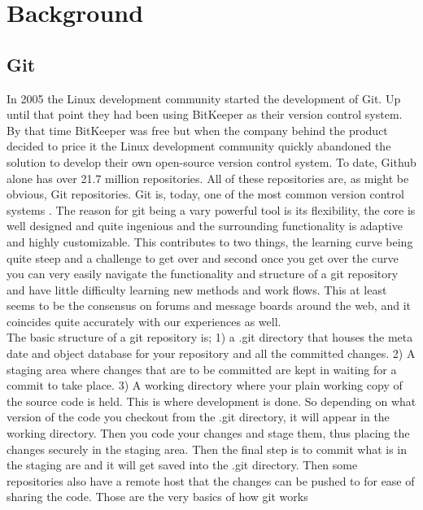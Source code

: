 \documentclass[a4paper,oneside]{bth} %
\begin{document}
		\chapter{Background}
			\section{Git}
			In 2005 the Linux development community started the development of Git.
			Up until that point they had been using BitKeeper as their version control system. By that time BitKeeper was free but when the company behind the product decided to price it the Linux development community quickly abandoned the solution to develop their own open-source version control system.\cite{ProGit}
			To date, Github alone has over 21.7 million repositories.\cite{GithubAbout} All of these repositories are, as might be obvious, Git repositories. 
			Git is, today, one of the most common version control systems \cite{EclipseDeveoperReport}\cite{DeveloperProductivity}\cite{MicrosoftSurveyResults}. The reason for git being a vary powerful tool is its flexibility, the core is well designed and quite ingenious and the surrounding functionality is adaptive and highly customizable. This contributes to two things, the learning curve being quite steep and a challenge to get over and second once you get over the curve you can very easily navigate the functionality and structure of a git repository and have little difficulty learning new methods and work flows. This at least seems to be the consensus on forums and message boards around the web, and it coincides quite accurately with our experiences as well.
			\\
			The basic structure of a git repository is; 1) a .git directory that houses the meta date and object database for your repository and all the committed changes. 2) A staging area where changes that are to be committed are kept in waiting for a commit to take place. 3) A working directory where your plain working copy of the source code is held. This is where development is done. \cite{GitStructure} 
			So depending on what version of the code you checkout from the .git directory, it will appear in the working directory. Then you code your changes and stage them, thus placing the changes securely in the staging area. Then the final step is to commit what is in the staging are and it will get saved into the .git directory. Then some repositories also have a remote host that the changes can be pushed to for ease of sharing the code. Those are the very basics of how git works \cite{GitStructure}
			
\end{document}
